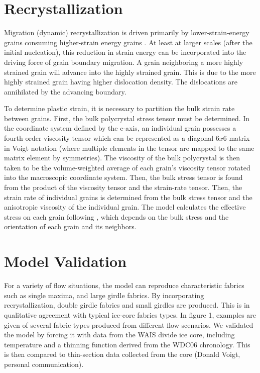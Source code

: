 \documentclass[TC, hvmath, online]{copernicus}
\begin{document}
{\section{Recrystallization}
Migration (dynamic) recrystallization is driven primarily by lower-strain-energy grains consuming higher-strain energy grains \citep{duval1995}. At least at larger scales (after the initial nucleation), this reduction in strain energy can be incorporated into the driving force of grain boundary migration. A grain neighboring a more highly strained grain will advance into the highly strained grain. This is due to the more highly strained grain having higher dislocation density. The dislocations are annihilated by the advancing boundary. 

To determine plastic strain, it is necessary to partition the bulk strain rate between grains. First, the bulk polycrystal stress tensor must be determined. In the coordinate system defined by the c-axis, an individual grain possesses a fourth-order viscosity tensor which can be represented as a diagonal $6x6$ matrix in Voigt notation (where multiple elements in the tensor are mapped to the same matrix element by symmetries). The viscosity of the bulk polycrystal is then taken to be the volume-weighted average of each grain's viscosity tensor rotated into the macroscopic coordinate system. Then, the bulk stress tensor is found from the product of the viscosity tensor and the strain-rate tensor. Then, the strain rate of individual grains is determined from the bulk stress tensor and the anisotropic viscosity of the individual grain. The model calculates the effective stress on each grain following \citet{azuma96}, which depends on the bulk stress and the orientation of each grain and its neighbors.  


\section{Model Validation}
For a variety of flow situations, the model can reproduce characteristic fabrics such as single maxima, and large girdle fabrics. By incorporating recrystallization, double girdle fabrics and small girdles are produced. This is in qualitative agreement with typical ice-core fabrics types. In figure 1, examples are given of several fabric types produced from different flow scenarios. We validated the model by forcing it with data from the WAIS divide ice core, including temperature and a thinning function derived from the WDC06 chronology. This is then compared to thin-section data collected from the core (Donald Voigt, personal communication).

}
\end{document}
